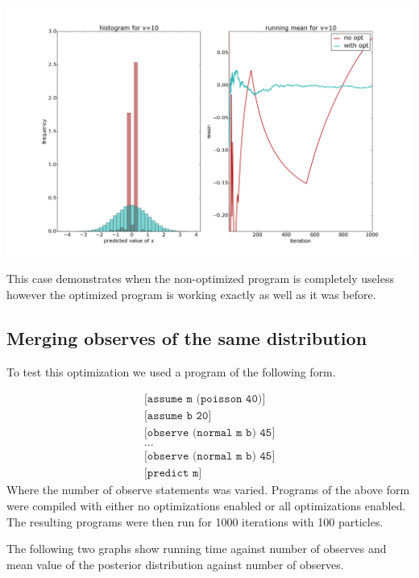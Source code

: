 \documentclass[a4paper]{article}
\begin{document}
\centerline{\includegraphics[width=16cm]{images/pushing_samples_back_2.png}}

This case demonstrates when the non-optimized program is completely useless however the optimized program is working exactly as well as it was before.




\subsection{Merging observes of the same distribution}

To test this optimization we used a program of the following form.

\[
	\begin{array}{l}
		\texttt{[assume m (poisson 40)]} \\
		\texttt{[assume b 20]} \\
		\texttt{[observe (normal m b) 45]} \\
		\texttt{...} \\
		\texttt{[observe (normal m b) 45]} \\
		\texttt{[predict m]}
	\end{array}
\]
Where the number of observe statements was varied. Programs of the above form were compiled with either no optimizations enabled or all optimizations enabled. The resulting programs were then run for 1000 iterations with 100 particles.

The following two graphs show running time against number of observes and mean value of the posterior distribution against number of observes.
\end{document}
